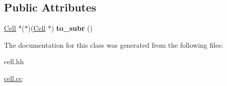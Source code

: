 \subsection*{Public Attributes}
\begin{DoxyCompactItemize}
\item 
\hypertarget{classCell_afb40fe5500f4e871d2a5ea82afd3dbf4}{\hyperlink{classCell}{Cell} $\ast$($\ast$)(\hyperlink{classCell}{Cell} $\ast$) {\bfseries to\-\_\-subr} ()}\label{classCell_afb40fe5500f4e871d2a5ea82afd3dbf4}

\end{DoxyCompactItemize}


The documentation for this class was generated from the following files\-:\begin{DoxyCompactItemize}
\item 
cell.\-hh\item 
\hyperlink{cell_8cc}{cell.\-cc}\end{DoxyCompactItemize}
